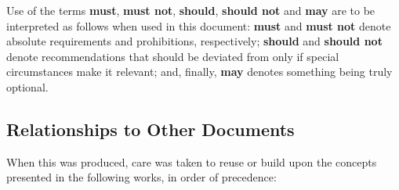 Use of the terms \textbf{must}, \textbf{must not}, \textbf{should}, \textbf{should not} and \textbf{may} are to be interpreted as follows when used in this document: \textbf{must} and \textbf{must not} denote absolute requirements and prohibitions, respectively; \textbf{should} and \textbf{should not} denote recommendations that should be deviated from only if special circumstances make it relevant; and, finally, \textbf{may} denotes something being truly optional.

\subsection{Relationships to Other Documents}
\label{sec:introduction:relationships}

When this  was produced, care was taken to reuse or build upon the concepts presented in the following works, in order of precedence:

